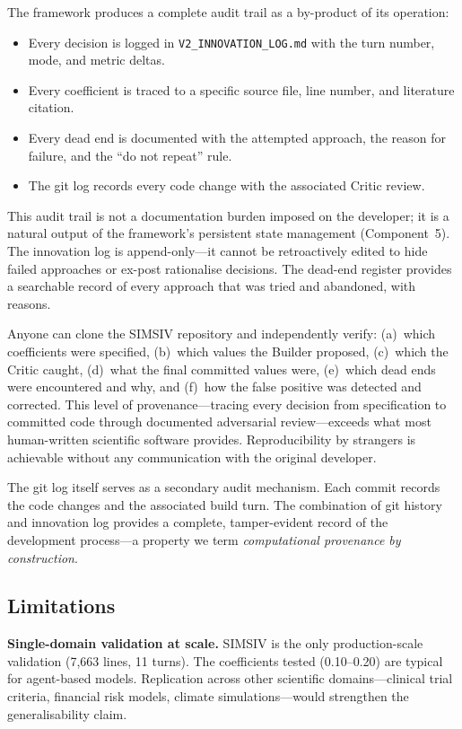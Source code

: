 \documentclass[11pt,a4paper]{article}
\begin{document}
The framework produces a complete audit trail as a by-product of its operation:
\begin{itemize}[leftmargin=*]
\item Every decision is logged in \texttt{V2\_INNOVATION\_LOG.md} with the turn number, mode, and metric deltas.
\item Every coefficient is traced to a specific source file, line number, and literature citation.
\item Every dead end is documented with the attempted approach, the reason for failure, and the ``do not repeat'' rule.
\item The git log records every code change with the associated Critic review.
\end{itemize}

This audit trail is not a documentation burden imposed on the developer; it is a natural output of the framework's persistent state management (Component~5). The innovation log is append-only---it cannot be retroactively edited to hide failed approaches or ex-post rationalise decisions. The dead-end register provides a searchable record of every approach that was tried and abandoned, with reasons.

Anyone can clone the SIMSIV repository and independently verify: (a)~which coefficients were specified, (b)~which values the Builder proposed, (c)~which the Critic caught, (d)~what the final committed values were, (e)~which dead ends were encountered and why, and (f)~how the false positive was detected and corrected. This level of provenance---tracing every decision from specification to committed code through documented adversarial review---exceeds what most human-written scientific software provides. Reproducibility by strangers is achievable without any communication with the original developer.

The git log itself serves as a secondary audit mechanism. Each commit records the code changes and the associated build turn. The combination of git history and innovation log provides a complete, tamper-evident record of the development process---a property we term \textit{computational provenance by construction}.

\subsection{Limitations}

\textbf{Single-domain validation at scale.} SIMSIV is the only production-scale validation (7,663 lines, 11 turns). The coefficients tested (0.10--0.20) are typical for agent-based models. Replication across other scientific domains---clinical trial criteria, financial risk models, climate simulations---would strengthen the generalisability claim.
\end{document}
